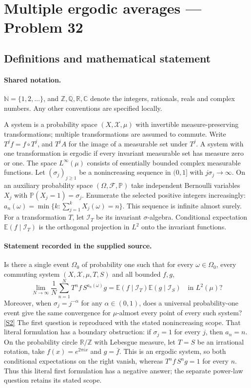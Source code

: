 \documentclass[11pt]{article}
\newcommand{\sref}[2]{\hyperlink{source:#1:#2}{[S#2]}}
\begin{document}
\section{Multiple ergodic averages — Problem 32}\label{statement}

\subsection{Definitions and mathematical statement}

\paragraph{Shared notation.}$\mathbb N=\{1,2,\ldots\}$, and $\mathbb Z,\mathbb Q,\mathbb R,\mathbb C$ denote the integers, rationals, reals and complex numbers. Any other conventions are specified locally.


A system is a probability space $(X,\mathcal X,\mu)$ with invertible measure-preserving transformations; multiple transformations are assumed to commute. Write $T^j f=f\circ T^j$, and $T^j A$ for the image of a measurable set under $T^j$. A system with one transformation is ergodic if every invariant measurable set has measure zero or one. The space $L^\infty(\mu)$ consists of essentially bounded complex measurable functions. Let $(\sigma_j)_{j\ge1}$ be a nonincreasing sequence in $(0,1]$ with $j\sigma_j\to\infty$. On an auxiliary probability space $(\Omega,\mathcal F,\mathbb P)$ take independent Bernoulli variables $X_j$ with $\mathbb P(X_j=1)=\sigma_j$. Enumerate the selected positive integers increasingly: $a_n(\omega)=\min\{k:\sum_{j=1}^kX_j(\omega)=n\}$. This sequence is infinite almost surely. For a transformation $T$, let $\mathcal I_T$ be its invariant $\sigma$-algebra. Conditional expectation $\mathbb E(f\mid\mathcal I_T)$ is the orthogonal projection in $L^2$ onto the invariant functions.
\paragraph{Statement recorded in the supplied source.}
Is there a single event $\Omega_0$ of probability one such that for every $\omega\in\Omega_0$, every commuting system $(X,\mathcal X,\mu,T,S)$ and all bounded $f,g$, \[\lim_{N\to\infty}\frac1N\sum_{n=1}^NT^nf\,S^{a_n(\omega)}g=\mathbb E(f\mid\mathcal I_T)\mathbb E(g\mid\mathcal I_S)\quad\text{in }L^2(\mu)?\] Moreover, when $\sigma_j=j^{-\alpha}$ for any $\alpha\in(0,1)$, does a universal probability-one event give the same convergence for $\mu$-almost every point of every such system? \sref{statement}{2}
The first question is reproduced with the stated nonincreasing scope. That literal formulation has a boundary obstruction: if $\sigma_j=1$ for every $j$, then $a_n=n$. On the probability circle $\mathbb R/\mathbb Z$ with Lebesgue measure, let $T=S$ be an irrational rotation, take $f(x)=e^{2\pi i x}$ and $g=\bar f$. This is an ergodic system, so both conditional expectations on the right vanish, whereas $T^nf\,S^ng=1$ for every $n$. Thus this literal first formulation has a negative answer; the separate power-law question retains its stated scope.
\end{document}
